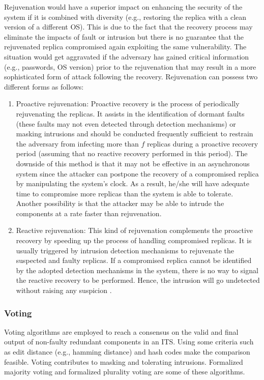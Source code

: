 \documentclass[preprint,number,12pt]{elsarticle}
\begin{document}
Rejuvenation would have a superior impact on enhancing the security of the system if it is combined with diversity (e.g., restoring the replica with a clean version of a different OS). This is due to the fact that the recovery process may eliminate the impacts of fault or intrusion but there is no guarantee that the rejuvenated replica compromised again exploiting the same vulnerability. The situation would get aggravated if the adversary has gained critical information (e.g., passwords, OS version) prior to the rejuvenation that may result in a more sophisticated form of attack following the recovery.
Rejuvenation can possess two different forms as follows:
\begin{enumerate}
\item Proactive rejuvenation: Proactive recovery is the process of periodically rejuvenating the replicas. It assists in the identification of dormant faults (these faults may not even detected through detection mechanisms) or masking intrusions and should be conducted frequently sufficient to restrain the adversary from infecting more than $f$ replicas during a proactive recovery period (assuming that no reactive recovery performed in this period). The downside of this method is that it may not be effective in an asynchronous system since the attacker can postpone the recovery of a compromised replica by manipulating the system's clock. As a result, he/she will have adequate time to compromise more replicas than the system is able to tolerate\citep{Sousa2010}. Another possibility is that the attacker may be able to intrude the components at a rate faster than rejuvenation\citep{Sousa2006}.
\item Reactive rejuvenation: This kind of rejuvenation complements the 
proactive recovery by speeding up the process of handling compromised
 replicas. It is usually triggered by intrusion detection mechanisms to 
rejuvenate  the suspected and faulty replicas. If a compromised replica 
cannot be identified by the adopted detection mechanisms in the system, 
there is no way to signal the reactive recovery to be performed. Hence, 
the intrusion will go undetected without raising any suspicion \citep{springerlink:10.1007/978-3-642-23971-7_36}.
\end{enumerate}
\subsubsection{Voting}
Voting algorithms are employed to reach a consensus on the valid and final output of non-faulty redundant components in an ITS. Using some criteria such as edit distance (e.g., hamming distance) and hash codes make the comparison feasible. Voting contributes to masking and tolerating intrusions. Formalized majority voting and formalized plurality voting are some of these algorithms\citep{Wang2003b}.
\end{document}
